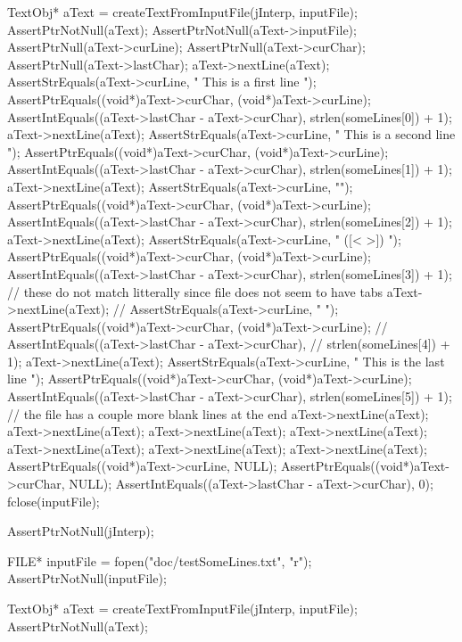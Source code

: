   TextObj* aText = createTextFromInputFile(jInterp, inputFile);
  AssertPtrNotNull(aText);
  AssertPtrNotNull(aText->inputFile);
  AssertPtrNull(aText->curLine);
  AssertPtrNull(aText->curChar);
  AssertPtrNull(aText->lastChar);
  aText->nextLine(aText);
  AssertStrEquals(aText->curLine, "  This is a first line  \n");
  AssertPtrEquals((void*)aText->curChar, (void*)aText->curLine);
  AssertIntEquals((aText->lastChar - aText->curChar),
                        strlen(someLines[0]) + 1);
  aText->nextLine(aText);
  AssertStrEquals(aText->curLine, "  This is a second line   \n");
  AssertPtrEquals((void*)aText->curChar, (void*)aText->curLine);
  AssertIntEquals((aText->lastChar - aText->curChar),
                        strlen(someLines[1]) + 1);
  aText->nextLine(aText);
  AssertStrEquals(aText->curLine, "\n");
  AssertPtrEquals((void*)aText->curChar, (void*)aText->curLine);
  AssertIntEquals((aText->lastChar - aText->curChar),
                        strlen(someLines[2]) + 1);
  aText->nextLine(aText);
  AssertStrEquals(aText->curLine, " ([<{ }>]) \n");
  AssertPtrEquals((void*)aText->curChar, (void*)aText->curLine);
  AssertIntEquals((aText->lastChar - aText->curChar),
                        strlen(someLines[3]) + 1);
  // these do not match litterally since file does not seem to have tabs
  aText->nextLine(aText);
//  AssertStrEquals(aText->curLine, "     	\n");
  AssertPtrEquals((void*)aText->curChar, (void*)aText->curLine);
//  AssertIntEquals((aText->lastChar - aText->curChar),
//                        strlen(someLines[4]) + 1);
  aText->nextLine(aText);
  AssertStrEquals(aText->curLine, "  This is the last line  \n");
  AssertPtrEquals((void*)aText->curChar, (void*)aText->curLine);
  AssertIntEquals((aText->lastChar - aText->curChar),
                        strlen(someLines[5]) + 1);
  // the file has a couple more blank lines at the end
  aText->nextLine(aText);
  aText->nextLine(aText);
  aText->nextLine(aText);
  aText->nextLine(aText);
  aText->nextLine(aText);
  aText->nextLine(aText);
  aText->nextLine(aText);
  AssertPtrEquals((void*)aText->curLine, NULL);
  AssertPtrEquals((void*)aText->curChar, NULL);
  AssertIntEquals((aText->lastChar - aText->curChar), 0);
  fclose(inputFile);
\stopCTest
\stopTestCase

\startCTest
  AssertPtrNotNull(jInterp);

  FILE* inputFile = fopen("doc/testSomeLines.txt", "r");
  AssertPtrNotNull(inputFile);
  
  TextObj* aText = createTextFromInputFile(jInterp, inputFile);
  AssertPtrNotNull(aText);

